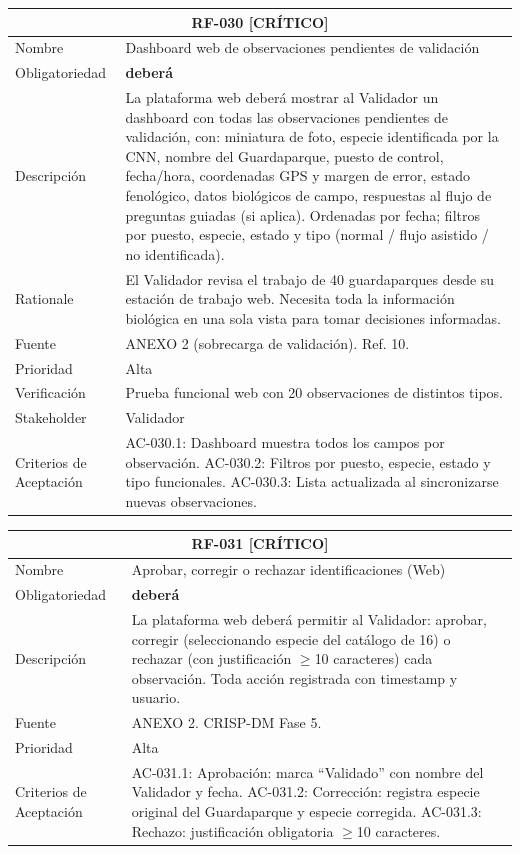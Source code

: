 \documentclass[12pt, a4paper]{article}
\newcommand{\criticomark}{\textcolor{criticolor}{\textbf{[CR\'ITICO]}}}
\begin{document}
\begin{longtable}{|p{3cm}|p{11.5cm}|}
\hline
\multicolumn{2}{|c|}{\textbf{RF-030} \criticomark} \\
\hline
Nombre & Dashboard web de observaciones pendientes de validaci\'on \\
\hline
Obligatoriedad & \textbf{deber\'a} \\
\hline
Descripci\'on & La plataforma web deber\'a mostrar al Validador un dashboard con todas las observaciones pendientes de validaci\'on, con: miniatura de foto, especie identificada por la CNN, nombre del Guardaparque, puesto de control, fecha/hora, coordenadas GPS y margen de error, estado fenol\'ogico, datos biol\'ogicos de campo, respuestas al flujo de preguntas guiadas (si aplica). Ordenadas por fecha; filtros por puesto, especie, estado y tipo (normal / flujo asistido / no identificada). \\
\hline
Rationale & El Validador revisa el trabajo de 40 guardaparques desde su estaci\'on de trabajo web. Necesita toda la informaci\'on biol\'ogica en una sola vista para tomar decisiones informadas. \\
\hline
Fuente & ANEXO 2 (sobrecarga de validaci\'on). Ref. 10. \\
\hline
Prioridad & Alta \\
\hline
Verificaci\'on & Prueba funcional web con 20 observaciones de distintos tipos. \\
\hline
Stakeholder & Validador \\
\hline
Criterios de Aceptaci\'on &
AC-030.1: Dashboard muestra todos los campos por observaci\'on. \newline
AC-030.2: Filtros por puesto, especie, estado y tipo funcionales. \newline
AC-030.3: Lista actualizada al sincronizarse nuevas observaciones. \\
\hline
\end{longtable}

\begin{longtable}{|p{3cm}|p{11.5cm}|}
\hline
\multicolumn{2}{|c|}{\textbf{RF-031} \criticomark} \\
\hline
Nombre & Aprobar, corregir o rechazar identificaciones (Web) \\
\hline
Obligatoriedad & \textbf{deber\'a} \\
\hline
Descripci\'on & La plataforma web deber\'a permitir al Validador: aprobar, corregir (seleccionando especie del cat\'alogo de 16) o rechazar (con justificaci\'on $\geq$10 caracteres) cada observaci\'on. Toda acci\'on registrada con timestamp y usuario. \\
\hline
Fuente & ANEXO 2. CRISP-DM Fase 5. \\
\hline
Prioridad & Alta \\
\hline
Criterios de Aceptaci\'on &
AC-031.1: Aprobaci\'on: marca ``Validado'' con nombre del Validador y fecha. \newline
AC-031.2: Correcci\'on: registra especie original del Guardaparque y especie corregida. \newline
AC-031.3: Rechazo: justificaci\'on obligatoria $\geq$10 caracteres. \\
\hline
\end{longtable}
\end{document}
